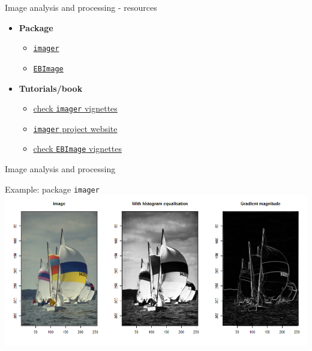 \documentclass[8pt,ignorenonframetext,]{beamer}
\providecommand{\tightlist}{%
  \setlength{\itemsep}{0pt}\setlength{\parskip}{0pt}}
\begin{document}
\begin{frame}[fragile]{Image analysis and processing - resources}

\begin{itemize}
\tightlist
\item
  \textbf{Package}

  \begin{itemize}
  \tightlist
  \item
    \href{https://cran.r-project.org/web/packages/imager/index.html}{\texttt{imager}}
  \item
    \href{https://cran.r-project.org/web/packages/EBImage/index.html}{\texttt{EBImage}}
  \end{itemize}
\item
  \textbf{Tutorials/book}

  \begin{itemize}
  \tightlist
  \item
    \href{https://cran.r-project.org/web/packages/imager/index.html}{check
    \texttt{imager} vignettes}
  \item
    \href{https://dahtah.github.io/imager/}{\texttt{imager} project
    website}
  \item
    \href{https://www.bioconductor.org/packages/3.7/bioc/vignettes/EBImage/inst/doc/EBImage-introduction.html}{check
    \texttt{EBImage} vignettes}
  \end{itemize}
\end{itemize}

\end{frame}

\begin{frame}[fragile]{Image analysis and processing}

Example: package \texttt{imager}
\includegraphics{imgPres/image_processing.png}

\end{frame}
\end{document}
